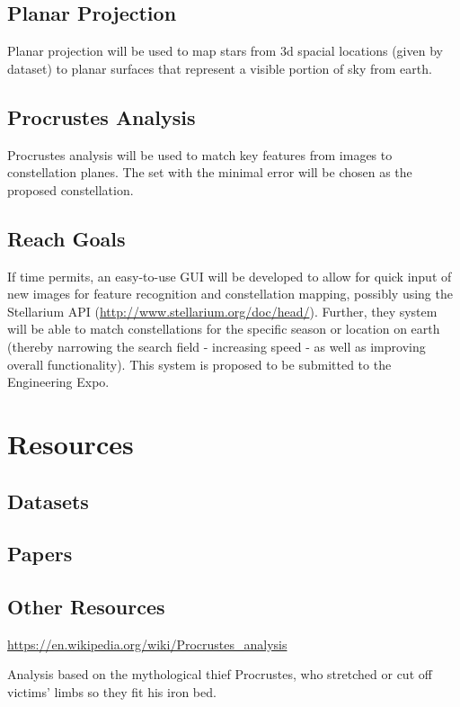 \documentclass{article}
\begin{document}
\subsection{Planar Projection}
Planar projection will be used to map stars from 3d spacial locations (given by dataset) to planar surfaces that represent a visible portion of sky from earth. \par
\subsection{Procrustes Analysis}
Procrustes analysis will be used to match key features from images to constellation planes. The set with the minimal error will be chosen as the proposed constellation.
\subsection{Reach Goals}
If time permits, an easy-to-use GUI will be developed to allow for quick input of new images for feature recognition and constellation mapping, possibly using the Stellarium API (\url{http://www.stellarium.org/doc/head/}). Further, they system will be able to match constellations for the specific season or location on earth (thereby narrowing the search field - increasing speed - as well as improving overall functionality). This system is proposed to be submitted to the Engineering Expo. 


\section{Resources}


\subsection{Datasets}

\subsection{Papers}





\subsection{Other Resources}
\url{https://en.wikipedia.org/wiki/Procrustes_analysis}

Analysis based on the mythological thief Procrustes, who stretched or cut off victims' limbs so they fit his iron bed.
\end{document}
